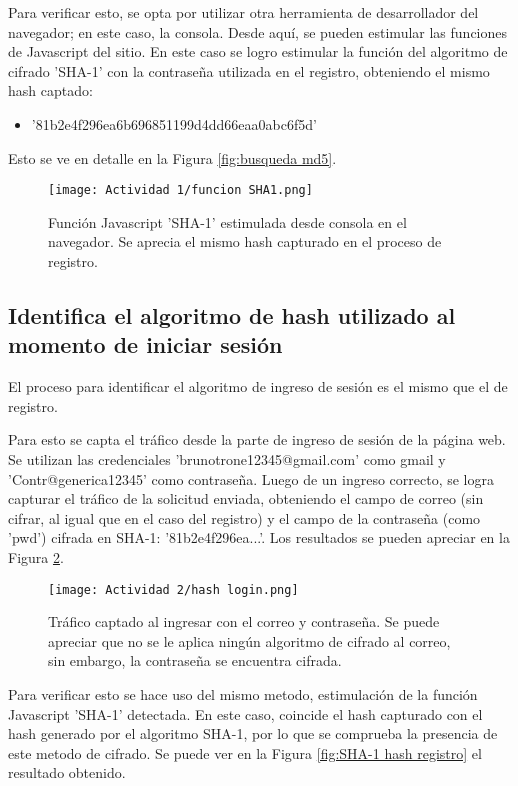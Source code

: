 \documentclass[letter,12pt]{article}
\begin{document}
Para verificar esto, se opta por utilizar otra herramienta de desarrollador del navegador; en este caso, la consola. Desde aquí, se pueden estimular las funciones de Javascript del sitio. En este caso se logro estimular la función del algoritmo de cifrado 'SHA-1' con la contraseña utilizada en el registro, obteniendo el mismo hash captado:

\begin{itemize}
    \item '81b2e4f296ea6b696851199d4dd66eaa0abc6f5d'
\end{itemize}

Esto se ve en detalle en la Figura \ref{fig:busqueda md5}.

\begin{figure}[H]
    \centering
    \texttt{[image: Actividad 1/funcion SHA1.png]}
    \caption{Función Javascript 'SHA-1' estimulada desde consola en el navegador. Se aprecia el mismo hash capturado en el proceso de registro.}
    \label{fig:placeholder}
\end{figure}

\subsection{Identifica el algoritmo de hash utilizado al momento de iniciar sesión}
El proceso para identificar el algoritmo de ingreso de sesión es el mismo que el de registro.

Para esto se capta el tráfico desde la parte de ingreso de sesión de la página web. Se utilizan las credenciales 'brunotrone12345@gmail.com' como gmail y 'Contr@generica12345' como contraseña. Luego de un ingreso correcto, se logra capturar el tráfico de la solicitud enviada, obteniendo el campo de correo (sin cifrar, al igual que en el caso del registro) y el campo de la contraseña (como 'pwd') cifrada en SHA-1:  '81b2e4f296ea...'. Los resultados se pueden apreciar en la Figura \ref{fig:hash login}.

\begin{figure}[H]
    \centering
    \texttt{[image: Actividad 2/hash login.png]}
    \caption{Tráfico captado al ingresar con el correo y contraseña. Se puede apreciar que no se le aplica ningún algoritmo de cifrado al correo, sin embargo, la contraseña se encuentra cifrada.}
    \label{fig:hash login}
\end{figure}

Para verificar esto se hace uso del mismo metodo, estimulación de la función Javascript 'SHA-1' detectada. En este caso, coincide el hash capturado con el hash generado por el algoritmo SHA-1, por lo que se comprueba la presencia de este metodo de cifrado. Se puede ver en la Figura \ref{fig:SHA-1 hash registro} el resultado obtenido.
\end{document}

